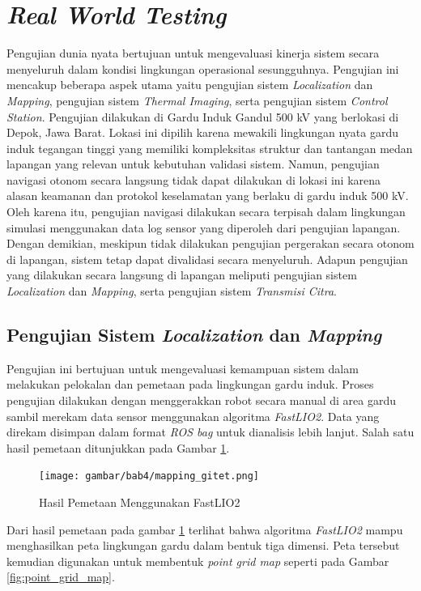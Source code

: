 \section{\emph{Real World Testing}}
Pengujian dunia nyata bertujuan untuk mengevaluasi kinerja sistem secara menyeluruh dalam kondisi lingkungan operasional sesungguhnya. Pengujian ini mencakup beberapa aspek utama yaitu pengujian sistem \emph{Localization} dan \emph{Mapping}, pengujian sistem \emph{Thermal Imaging}, serta pengujian sistem \emph{Control Station}. Pengujian dilakukan di Gardu Induk Gandul 500 kV yang berlokasi di Depok, Jawa Barat. Lokasi ini dipilih karena mewakili lingkungan nyata gardu induk tegangan tinggi yang memiliki kompleksitas struktur dan tantangan medan lapangan yang relevan untuk kebutuhan validasi sistem. Namun, pengujian navigasi otonom secara langsung tidak dapat dilakukan di lokasi ini karena alasan keamanan dan protokol keselamatan yang berlaku di gardu induk 500 kV. Oleh karena itu, pengujian navigasi dilakukan secara terpisah dalam lingkungan simulasi menggunakan data log sensor yang diperoleh dari pengujian lapangan.  Dengan demikian, meskipun tidak dilakukan pengujian pergerakan secara otonom di lapangan, sistem tetap dapat divalidasi secara menyeluruh. Adapun pengujian yang dilakukan secara langsung di lapangan meliputi pengujian sistem \emph{Localization} dan \emph{Mapping}, serta pengujian sistem \emph{Transmisi Citra}.



\subsection{Pengujian Sistem \emph{Localization} dan \emph{Mapping}}
Pengujian ini bertujuan untuk mengevaluasi kemampuan sistem dalam melakukan pelokalan dan pemetaan pada lingkungan gardu induk. Proses pengujian dilakukan dengan menggerakkan robot secara manual di area gardu sambil merekam data sensor menggunakan algoritma \emph{FastLIO2}. Data yang direkam disimpan dalam format \emph{ROS bag} untuk dianalisis lebih lanjut. Salah satu hasil pemetaan ditunjukkan pada Gambar \ref{fig:fastlio2_mapping}.

\begin{figure}[H]
\centering
\texttt{[image: gambar/bab4/mapping\_gitet.png]}
\caption{Hasil Pemetaan Menggunakan FastLIO2}
\label{fig:fastlio2_mapping}
\end{figure}

Dari hasil pemetaan pada gambar \ref{fig:fastlio2_mapping} terlihat bahwa algoritma \emph{FastLIO2} mampu menghasilkan peta lingkungan gardu dalam bentuk tiga dimensi. Peta tersebut kemudian digunakan untuk membentuk \emph{point grid map} seperti pada Gambar \ref{fig:point_grid_map}.

